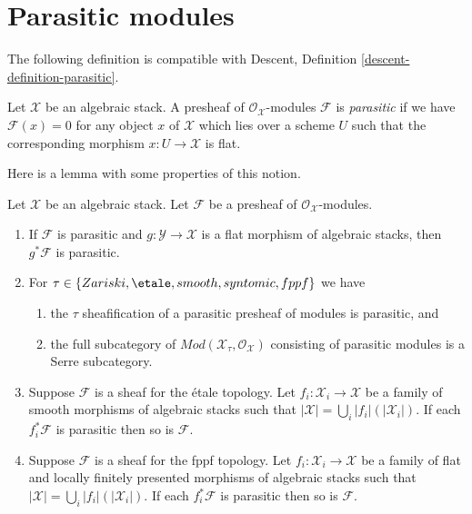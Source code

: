 \section{Parasitic modules}
\label{section-parasitic}

\noindent
The following definition is compatible with
Descent, Definition \ref{descent-definition-parasitic}.

\begin{definition}
\label{definition-parasitic}
Let $\mathcal{X}$ be an algebraic stack.
A presheaf of $\mathcal{O}_\mathcal{X}$-modules $\mathcal{F}$ is
{\it parasitic} if we have $\mathcal{F}(x) = 0$ for any object $x$
of $\mathcal{X}$ which lies over a scheme $U$ such that the corresponding
morphism $x : U \to \mathcal{X}$ is flat.
\end{definition}

\noindent
Here is a lemma with some properties of this notion.

\begin{lemma}
\label{lemma-parasitic}
Let $\mathcal{X}$ be an algebraic stack. Let $\mathcal{F}$
be a presheaf of $\mathcal{O}_\mathcal{X}$-modules.
\begin{enumerate}
\item If $\mathcal{F}$ is parasitic and
$g : \mathcal{Y} \to \mathcal{X}$ is a flat morphism of algebraic stacks,
then $g^*\mathcal{F}$ is parasitic.
\item For $\tau \in \{Zariski, \etale, smooth, syntomic, fppf\}$
we have
\begin{enumerate}
\item the $\tau$ sheafification of a parasitic presheaf of modules is
parasitic, and
\item the full subcategory of
$\textit{Mod}(\mathcal{X}_\tau, \mathcal{O}_\mathcal{X})$
consisting of parasitic modules is a Serre subcategory.
\end{enumerate}
\item Suppose $\mathcal{F}$ is a sheaf for the \'etale topology.
Let $f_i : \mathcal{X}_i \to \mathcal{X}$ be a family of
smooth morphisms of algebraic stacks such that
$|\mathcal{X}| = \bigcup_i |f_i|(|\mathcal{X}_i|)$. If each
$f_i^*\mathcal{F}$ is parasitic then so is $\mathcal{F}$.
\item Suppose $\mathcal{F}$ is a sheaf for the fppf topology.
Let $f_i : \mathcal{X}_i \to \mathcal{X}$ be a family of
flat and locally finitely presented morphisms of algebraic stacks such that
$|\mathcal{X}| = \bigcup_i |f_i|(|\mathcal{X}_i|)$. If each
$f_i^*\mathcal{F}$ is parasitic then so is $\mathcal{F}$.
\end{enumerate}
\end{lemma}

